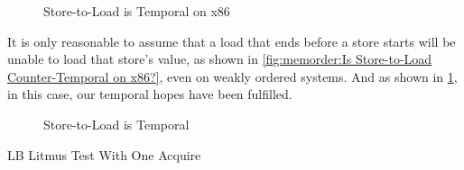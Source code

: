 {\begin{figure}
\centering
{}
\caption{Store-to-Load is Temporal on x86}
\label{fig:memorder:Store-to-Load is Temporal on x86}
\end{figure}

	It is only reasonable to assume that a load that ends before
	a store starts will be unable to load that store's value,
	as shown in
	\cref{fig:memorder:Is Store-to-Load Counter-Temporal on x86?},
	even on weakly ordered systems.
	And as shown in
	\cref{fig:memorder:Store-to-Load is Temporal on x86},
	in this case, our temporal hopes have been fulfilled.
}\QuickQuizEnd

\begin{figure}
\centering
{}
\caption{Store-to-Load is Temporal}
\label{fig:memorder:Store-to-Load is Temporal}
\end{figure}

\begin{listing}

\caption{LB Litmus Test With One Acquire}
\label{lst:memorder:LB Litmus Test With One Acquire}
\end{listing}

